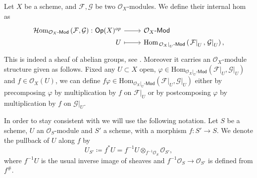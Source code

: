 \begin{defn}\label{defn:iHomOXMod}
	Let $X$ be a scheme, and $\mathcal{F}, \mathcal{G}$ be two $\mathcal{O}_{ X }$-modules.
	We define their internal hom as
	\begin{equation*}
	\begin{tikzcd}[row sep = 0ex
		,/tikz/column 1/.append style={anchor=base east}
		,/tikz/column 2/.append style={anchor=base west}]
		\mathcal{H}\mathrm{om}_{ \mathcal{O}_{ X }\text{-}\mathsf{Mod} }
		\left( \mathcal{F}, \mathcal{G} \right)\colon 
		\mathsf{Op}(X)^{op} \arrow[r, "", rightarrow] &
		\mathcal{O}_{ X }\text{-}\mathsf{Mod} \\
		U \arrow[r, "", mapsto] & 
		\mathrm{Hom}_{ \left.\mathcal{O}_{ X }\right|_{U}\text{-}\mathsf{Mod} } 
			\left( \left.\mathcal{F}\right|_{U}, \left.\mathcal{G}\right|_{U} \right)
	,\end{tikzcd}
	\end{equation*} 
	This is indeed a sheaf of abelian groups, see 
	\cite[\href{https://stacks.math.columbia.edu/tag/00AK}{Section 00AK}]{SP}.
	Moreover it carries an $\mathcal{O}_{ X }$-module structure given as follows.
	Fixed any $U \subset X$ open, 
	$\varphi \in \mathrm{Hom}_{ \left.\mathcal{O}_{ X }\right|_{U}\text{-}\mathsf{Mod}} 
	\left( \left.\mathcal{F}\right|_{U} , \left.\mathcal{G}\right|_{U} \right)$ and
	$f \in \mathcal{O}_{ X }(U)$, we can define $f \varphi \in
	\mathrm{Hom}_{ \left.\mathcal{O}_{ X }\right|_{U}\text{-}\mathsf{Mod}  } 
	\left( \left.\mathcal{F}\right|_{U} , \left.\mathcal{G}\right|_{U} \right)$
	either by precomposing $\varphi$ by multiplication
	by $f$ on $\left.\mathcal{F}\right|_{U}$ or by postcomposing $\varphi$
	by multiplication by $f$ on $\left.\mathcal{G}\right|_{U}$.
\end{defn}


\begin{ntt}[]
	In order to stay consistent with
	\cite{Messing} we will use the following notation.
	Let $S$ be a scheme, $U$ an $\mathcal{O}_{ S }$-module
	and $S'$ a scheme, with a morphism
	$f\colon S' \to S$.
	We denote the pullback of $U$ along $f$ by 
	\begin{equation*}
	U_{S'} \coloneqq f^*U = 
	f^{-1}U \otimes_{f^{-1}\mathcal{O}_{ S }} \mathcal{O}_{ S' }
	,\end{equation*}
	where $f^{-1} U$ is the usual inverse image of sheaves and
	$f^{-1}\mathcal{O}_{ S } \to \mathcal{O}_{ S' }$ is defined from $f^\#$.
\end{ntt}


